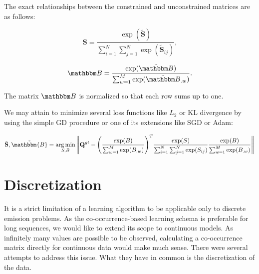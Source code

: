 \documentclass[shortabstract]{iithesis}
\DeclareMathOperator*{\argmin}{arg\,min}
\begin{document}
The exact relationships between the constrained and unconstrained matrices are as follows:

\begin{equation*}
     \textbf{S} = \frac{\exp(\tilde{\textbf{S}})}{\sum_{i=1}^N \sum_{j=1}^N \exp(\tilde {\textbf{S}}_{ij})}\text{,}
\end{equation*}

\begin{equation*}
    \mathbbm B = \frac{\exp(\tilde{\mathbbm B})}{\sum_{w=1}^M \exp( \tilde{\mathbbm B}_{.w})}\text{.}
\end{equation*}

The matrix $\mathbbm B$ is normalized so that each row sums up to one.

We may attain to minimize several loss functions like $L_2$ or KL divergence by using the simple GD procedure or one of its extensions like SGD or Adam:

\begin{equation*}
\begin{aligned}
    \tilde{\textbf{S}}, \tilde{\mathbbm{B}} = \argmin_{S, B}  \Bigg \Vert \textbf{Q}^{gt} - \Bigg( \frac{\exp(B)}{\sum_{w=1}^M \exp( B_{.w})} \Bigg)^T   \frac{\exp(S)}{\sum_{i=1}^N \sum_{j=1}^N \exp(S_{ij})} \frac{\exp(B)}{\sum_{w=1}^M \exp( B_{.w})} \Bigg \Vert 
\end{aligned}
\end{equation*}


\chapter{Discretization} \label{sec:disc_theory}

It is a strict limitation of a learning algorithm to be applicable only to discrete emission problems. As the co-occurrence-based learning schema is preferable for long sequences, we would like to extend its scope to continuous models. 
As infinitely many values are possible to be observed, calculating a co-occurrence matrix directly for continuous data would make much sense. There were several attempts to address this issue. What they have in common is the discretization of the data. 

\end{document}
